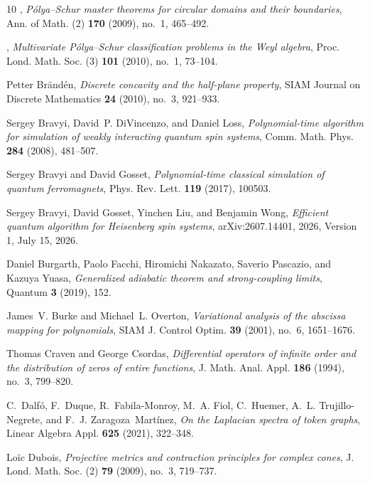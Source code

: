 \documentclass[reqno]{amsart}
\theoremstyle{definition}
\theoremstyle{remark}
\begin{document}
\begin{thebibliography}{10}
\bysame, \emph{{P{\'o}lya--Schur} master theorems for circular domains and
  their boundaries}, Ann. of Math. (2) \textbf{170} (2009), no.~1, 465--492.

\bysame, \emph{Multivariate {P{\'o}lya--Schur} classification problems in the
  {Weyl} algebra}, Proc. Lond. Math. Soc. (3) \textbf{101} (2010), no.~1,
  73--104.

Petter Br{\"a}nd{\'e}n, \emph{Discrete concavity and the half-plane property},
  SIAM Journal on Discrete Mathematics \textbf{24} (2010), no.~3, 921--933.

Sergey Bravyi, David~P. DiVincenzo, and Daniel Loss, \emph{Polynomial-time
  algorithm for simulation of weakly interacting quantum spin systems}, Comm.
  Math. Phys. \textbf{284} (2008), 481--507.

Sergey Bravyi and David Gosset, \emph{Polynomial-time classical simulation of
  quantum ferromagnets}, Phys. Rev. Lett. \textbf{119} (2017), 100503.

Sergey Bravyi, David Gosset, Yinchen Liu, and Benjamin Wong, \emph{Efficient
  quantum algorithm for {Heisenberg} spin systems}, arXiv:2607.14401, 2026,
  Version 1, July 15, 2026.

Daniel Burgarth, Paolo Facchi, Hiromichi Nakazato, Saverio Pascazio, and Kazuya
  Yuasa, \emph{Generalized adiabatic theorem and strong-coupling limits},
  Quantum \textbf{3} (2019), 152.

James~V. Burke and Michael~L. Overton, \emph{Variational analysis of the
  abscissa mapping for polynomials}, SIAM J. Control Optim. \textbf{39} (2001),
  no.~6, 1651--1676.

Thomas Craven and George Csordas, \emph{Differential operators of infinite
  order and the distribution of zeros of entire functions}, J. Math. Anal.
  Appl. \textbf{186} (1994), no.~3, 799--820.

C.~Dalf{\'o}, F.~Duque, R.~Fabila-Monroy, M.~A. Fiol, C.~Huemer, A.~L.
  Trujillo-Negrete, and F.~J. Zaragoza~Mart{\'i}nez, \emph{On the {Laplacian}
  spectra of token graphs}, Linear Algebra Appl. \textbf{625} (2021), 322--348.

Lo{\"i}c Dubois, \emph{Projective metrics and contraction principles for
  complex cones}, J. Lond. Math. Soc. (2) \textbf{79} (2009), no.~3, 719--737.


\end{thebibliography}
\end{document}
